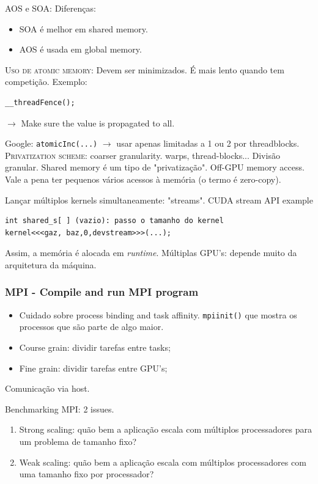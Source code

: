\documentclass[12pt]{report} %
\begin{document}
AOS e SOA: Diferenças:
\begin{itemize}
	\item SOA é melhor em shared memory.
	\item AOS é usada em global memory.
\end{itemize}

\textsc{Uso de atomic memory}: Devem ser minimizados. É mais lento quando tem competição. Exemplo:
\begin{verbatim}
__threadFence();
\end{verbatim}

$\rightarrow$ Make sure the value is propagated to all.

Google: \texttt{atomicInc(...)} $\rightarrow$ usar apenas limitadas a 1 ou 2 por threadblocks.\\ 
\textsc{Privatization scheme}: coarser granularity. warps, thread-blocks... Divisão granular. Shared memory é um tipo de "privatização". Off-GPU memory access. 
Vale a pena ter pequenos vários acessos à memória (o termo é zero-copy).

Lançar múltiplos kernels simultaneamente: "streams". CUDA stream API example
\begin{verbatim}
int shared_s[ ] (vazio): passo o tamanho do kernel
kernel<<<gaz, baz,0,devstream>>>(...);
\end{verbatim}
Assim, a memória é alocada em \textit{runtime}. Múltiplas GPU's: depende muito da arquitetura da máquina.

\subsubsection*{MPI - Compile and run MPI program}

\begin{itemize}
	\item Cuidado sobre process binding and task affinity. \texttt{mpiinit()} que mostra os processos que são parte de algo maior.
	\item Course grain: dividir tarefas entre tasks;
	\item Fine grain: dividir tarefas entre GPU's;
\end{itemize}

Comunicação via host.

Benchmarking MPI: 2 issues.
\begin{enumerate}
	\item Strong scaling: quão bem a aplicação escala com múltiplos processadores para um problema de tamanho fixo?
	\item Weak scaling: quão bem a aplicação escala com múltiplos processadores com uma tamanho fixo por processador?
\end{enumerate}
\end{document}
